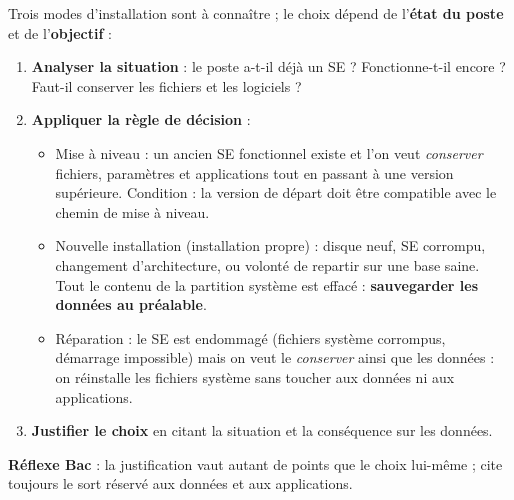 \documentclass[11pt]{article}
\newcommand{\cle}[1]{{\popxbold\color{popdark}#1}}
\begin{document}
\begin{methode}
Trois modes d'installation sont à connaître ; le choix dépend de l'\textbf{état du poste} et de l'\textbf{objectif} :
\begin{enumerate}
\item \textbf{Analyser la situation} : le poste a-t-il déjà un SE ? Fonctionne-t-il encore ? Faut-il conserver les fichiers et les logiciels ?
\item \textbf{Appliquer la règle de décision} :
\begin{itemize}
\item \cle{Mise à niveau} : un ancien SE fonctionnel existe et l'on veut \emph{conserver} fichiers, paramètres et applications tout en passant à une version supérieure. Condition : la version de départ doit être compatible avec le chemin de mise à niveau.
\item \cle{Nouvelle installation} (installation propre) : disque neuf, SE corrompu, changement d'architecture, ou volonté de repartir sur une base saine. Tout le contenu de la partition système est effacé : \textbf{sauvegarder les données au préalable}.
\item \cle{Réparation} : le SE est endommagé (fichiers système corrompus, démarrage impossible) mais on veut le \emph{conserver} ainsi que les données : on réinstalle les fichiers système sans toucher aux données ni aux applications.
\end{itemize}
\item \textbf{Justifier le choix} en citant la situation et la conséquence sur les données.
\end{enumerate}
\textbf{Réflexe Bac} : la justification vaut autant de points que le choix lui-même ; cite toujours le sort réservé aux données et aux applications.
\end{methode}
\end{document}
